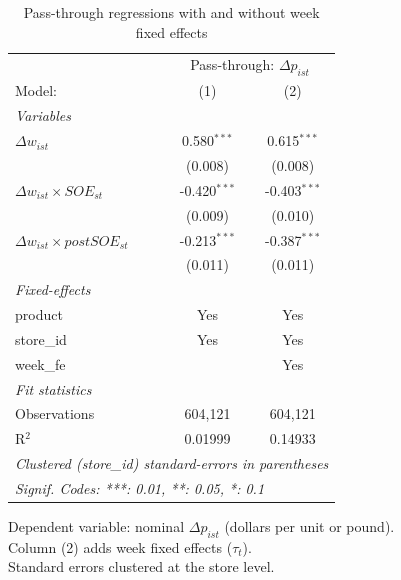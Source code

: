 
\begin{table}[htbp]
   \caption{\label{tab:passthrough_reg} Pass-through regressions with and without week fixed effects}
   \centering
   \begin{tabular}{lcc}
      \tabularnewline \midrule \midrule
       & \multicolumn{2}{c}{Pass-through: $\Delta p_{ist}$} \\ 
      Model:                                 & (1)            & (2)\\  
      \midrule
      \emph{Variables}\\
      $\Delta w_{ist}$                       & 0.580$^{***}$  & 0.615$^{***}$\\   
                                             & (0.008)        & (0.008)\\   
      $\Delta w_{ist} \times SOE_{st}$       & -0.420$^{***}$ & -0.403$^{***}$\\   
                                             & (0.009)        & (0.010)\\   
      $\Delta w_{ist} \times postSOE_{st}$   & -0.213$^{***}$ & -0.387$^{***}$\\   
                                             & (0.011)        & (0.011)\\   
      \midrule
      \emph{Fixed-effects}\\
      product                                & Yes            & Yes\\  
      store\_id                              & Yes            & Yes\\  
      week\_fe                               &                & Yes\\  
      \midrule
      \emph{Fit statistics}\\
      Observations                           & 604,121        & 604,121\\  
      R$^2$                                  & 0.01999        & 0.14933\\  
      \midrule \midrule
      \multicolumn{3}{l}{\emph{Clustered (store\_id) standard-errors in parentheses}}\\
      \multicolumn{3}{l}{\emph{Signif. Codes: ***: 0.01, **: 0.05, *: 0.1}}\\
   \end{tabular}
   
   \par \raggedright 
   Dependent variable: nominal $\Delta p_{ist}$ (dollars per unit or pound).\\
   Column (2) adds week fixed effects ($\tau_t$).\\
   Standard errors clustered at the store level.
\end{table}


